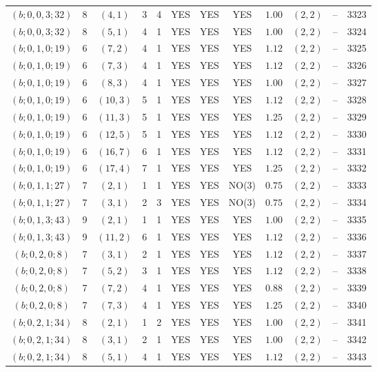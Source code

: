 \begin{longtable}{|c|c|c|c|c|c|c|c|c|c|c|c|}
$(b;0,0,3;32)$ & 8 & $(4,1)$ & 3 & 4 & YES & YES & YES & $1.00$ & $(2,2)$ & -- & 3323\\
$(b;0,0,3;32)$ & 8 & $(5,1)$ & 4 & 1 & YES & YES & YES & $1.00$ & $(2,2)$ & -- & 3324\\
$(b;0,1,0;19)$ & 6 & $(7,2)$ & 4 & 1 & YES & YES & YES & $1.12$ & $(2,2)$ & -- & 3325\\
$(b;0,1,0;19)$ & 6 & $(7,3)$ & 4 & 1 & YES & YES & YES & $1.12$ & $(2,2)$ & -- & 3326\\
$(b;0,1,0;19)$ & 6 & $(8,3)$ & 4 & 1 & YES & YES & YES & $1.00$ & $(2,2)$ & -- & 3327\\
$(b;0,1,0;19)$ & 6 & $(10,3)$ & 5 & 1 & YES & YES & YES & $1.12$ & $(2,2)$ & -- & 3328\\
$(b;0,1,0;19)$ & 6 & $(11,3)$ & 5 & 1 & YES & YES & YES & $1.25$ & $(2,2)$ & -- & 3329\\
$(b;0,1,0;19)$ & 6 & $(12,5)$ & 5 & 1 & YES & YES & YES & $1.12$ & $(2,2)$ & -- & 3330\\
$(b;0,1,0;19)$ & 6 & $(16,7)$ & 6 & 1 & YES & YES & YES & $1.12$ & $(2,2)$ & -- & 3331\\
$(b;0,1,0;19)$ & 6 & $(17,4)$ & 7 & 1 & YES & YES & YES & $1.25$ & $(2,2)$ & -- & 3332\\
$(b;0,1,1;27)$ & 7 & $(2,1)$ & 1 & 1 & YES & YES & NO(3) & $0.75$ & $(2,2)$ & -- & 3333\\
$(b;0,1,1;27)$ & 7 & $(3,1)$ & 2 & 3 & YES & YES & NO(3) & $0.75$ & $(2,2)$ & -- & 3334\\
$(b;0,1,3;43)$ & 9 & $(2,1)$ & 1 & 1 & YES & YES & YES & $1.00$ & $(2,2)$ & -- & 3335\\
$(b;0,1,3;43)$ & 9 & $(11,2)$ & 6 & 1 & YES & YES & YES & $1.12$ & $(2,2)$ & -- & 3336\\
$(b;0,2,0;8)$ & 7 & $(3,1)$ & 2 & 1 & YES & YES & YES & $1.12$ & $(2,2)$ & -- & 3337\\
$(b;0,2,0;8)$ & 7 & $(5,2)$ & 3 & 1 & YES & YES & YES & $1.12$ & $(2,2)$ & -- & 3338\\
$(b;0,2,0;8)$ & 7 & $(7,2)$ & 4 & 1 & YES & YES & YES & $0.88$ & $(2,2)$ & -- & 3339\\
$(b;0,2,0;8)$ & 7 & $(7,3)$ & 4 & 1 & YES & YES & YES & $1.25$ & $(2,2)$ & -- & 3340\\
$(b;0,2,1;34)$ & 8 & $(2,1)$ & 1 & 2 & YES & YES & YES & $1.00$ & $(2,2)$ & -- & 3341\\
$(b;0,2,1;34)$ & 8 & $(3,1)$ & 2 & 1 & YES & YES & YES & $1.00$ & $(2,2)$ & -- & 3342\\
$(b;0,2,1;34)$ & 8 & $(5,1)$ & 4 & 1 & YES & YES & YES & $1.12$ & $(2,2)$ & -- & 3343\\

\end{longtable}
